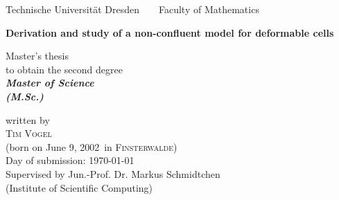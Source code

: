 



\newcommand{\name}{Vogel}
\newcommand{\vorname}{Tim}
\newcommand{\gebdatum}{June 9, 2002}
\newcommand{\ort}{Finsterwalde}
\newcommand{\betreuer}{Jun.-Prof. Dr. Markus Schmidtchen}
\newcommand{\institut}{Institute of Scientific Computing}
\newcommand{\thema}{Derivation and study of a non-confluent model for deformable cells}
\newcommand{\datum}{\today} %
\newcommand{\studiengang}{Technomathematics}



\thispagestyle{empty}

\begin{center}
{\Large Technische Universit\"{a}t Dresden\  \ \textbullet\ \ Faculty of Mathematics}

\vfil

{\bfseries\Huge\thema}

\vfil
{\LARGE
Master's thesis \\[\bigskipamount]
to obtain the second degree \\[\bigskipamount]
\bfseries{\itshape Master of Science\\
\textup{(}M.Sc.\textup{)}}\\[\bigskipamount]
}



\vfil\vfil

\vfil

written by
\\[\bigskipamount]
\textsc{\vorname} \textsc{\name}
\\[\bigskipamount]
(born on \gebdatum\ in \textsc{\ort})
\\[\bigskipamount]
Day of submission: \datum
\\[\bigskipamount]
Supervised by \betreuer\  \\ (\institut)
\end{center}